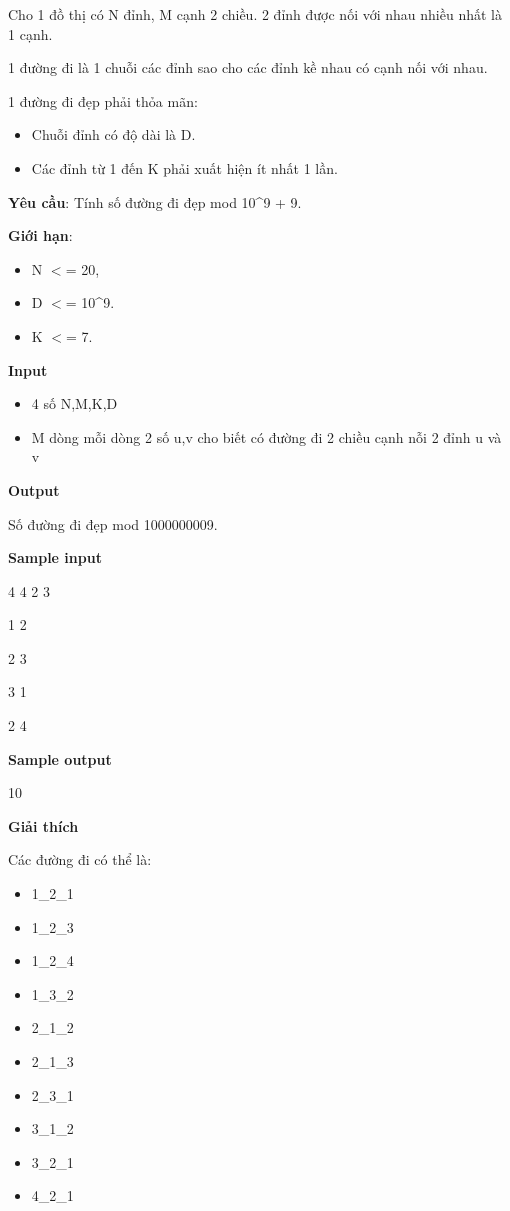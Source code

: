 

Cho 1 đồ thị có N đỉnh, M cạnh 2 chiều. 2 đỉnh được nối với nhau nhiều nhất là 1 cạnh.

1 đường đi là 1 chuỗi các đỉnh sao cho các đỉnh kề nhau có cạnh nối với nhau.

1 đường đi đẹp phải thỏa mãn:
\begin{itemize}
	\item Chuỗi đỉnh có độ dài là D.
	\item Các đỉnh từ 1 đến K phải xuất hiện ít nhất 1 lần.
\end{itemize}

\textbf{Yêu cầu}: Tính số đường đi đẹp mod 10\textasciicircum9 + 9.

\textbf{Giới hạn}:
\begin{itemize}
	\item N $<$= 20,
	\item D $<$= 10\textasciicircum9.
	\item K $<$= 7.
\end{itemize}

\textbf{Input}
\begin{itemize}
	\item 4 số N,M,K,D
	\item M dòng mỗi dòng 2 số u,v cho biết có đường đi 2 chiều cạnh nỗi 2 đỉnh u và v
\end{itemize}

\textbf{Output}

Số đường đi đẹp mod 1000000009.

\textbf{Sample input}

4 4 2 3

1 2

2 3

3 1

2 4

\textbf{Sample output}

10

\textbf{Giải thích}

Các đường đi có thể là:
\begin{itemize}
	\item 1\_2\_1
	\item 1\_2\_3
	\item 1\_2\_4
	\item 1\_3\_2
	\item 2\_1\_2
	\item 2\_1\_3
	\item 2\_3\_1
	\item 3\_1\_2
	\item 3\_2\_1
	\item 4\_2\_1
\end{itemize}

 

 

 

 